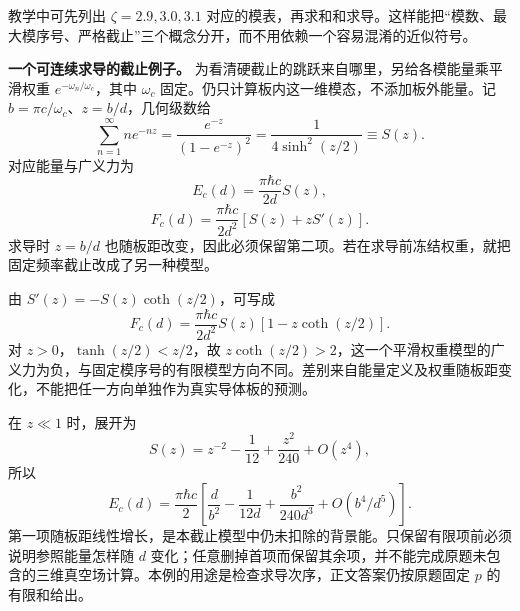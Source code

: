 \documentclass[12pt,a4paper,UTF8]{ctexart}
\begin{document}
教学中可先列出 \(\zeta=2.9,3.0,3.1\)
对应的模表，再求和和求导。这样能把``模数、最大模序号、严格截止''三个概念分开，而不用依赖一个容易混淆的近似符号。

\textbf{一个可连续求导的截止例子。}
为看清硬截止的跳跃来自哪里，另给各模能量乘平滑权重
\(e^{-\omega_n/\omega_c}\)，其中 \(\omega_c\)
固定。仍只计算板内这一维模态，不添加板外能量。记
\(b=\pi c/\omega_c\)、\(z=b/d\)，几何级数给 \[
\sum_{n=1}^{\infty}ne^{-nz}
=\frac{e^{-z}}{(1-e^{-z})^2}
=\frac1{4\sinh^2(z/2)}\equiv S(z).
\] 对应能量与广义力为 \[
E_c(d)=\frac{\pi\hbar c}{2d}S(z),
\] \[
F_c(d)=\frac{\pi\hbar c}{2d^2}[S(z)+zS'(z)].
\] 求导时 \(z=b/d\)
也随板距改变，因此必须保留第二项。若在求导前冻结权重，就把固定频率截止改成了另一种模型。

由 \(S'(z)=-S(z)\coth(z/2)\)，可写成 \[
F_c(d)=\frac{\pi\hbar c}{2d^2}S(z)
[1-z\coth(z/2)].
\] 对 \(z>0\)，\(\tanh(z/2)<z/2\)，故
\(z\coth(z/2)>2\)，这一个平滑权重模型的广义力为负，与固定模序号的有限模型方向不同。差别来自能量定义及权重随板距变化，不能把任一方向单独作为真实导体板的预测。

在 \(z\ll1\) 时，展开为 \[
S(z)=z^{-2}-\frac1{12}+\frac{z^2}{240}+O(z^4),
\] 所以 \[
E_c(d)=\frac{\pi\hbar c}{2}
\left[\frac d{b^2}-\frac1{12d}
+\frac{b^2}{240d^3}+O(b^4/d^5)\right].
\]
第一项随板距线性增长，是本截止模型中仍未扣除的背景能。只保留有限项前必须说明参照能量怎样随
\(d\)
变化；任意删掉首项而保留其余项，并不能完成原题未包含的三维真空场计算。本例的用途是检查求导次序，正文答案仍按原题固定
\(p\) 的有限和给出。
\end{document}

